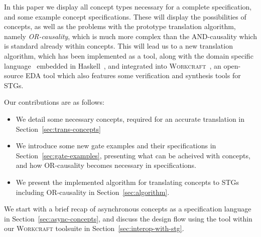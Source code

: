 \documentclass[british, journal]{IEEEtran}
\newcommand{\noun}[1]{\textsc{#1}}
\begin{document}
In this paper we display all concept types necessary for a complete specification, and some 
example concept specifications. These will display the possibilities of concepts, as well as the 
problems with the prototype translation algorithm, namely \emph{OR-causality}, which is 
much more complex than the AND-causality which is standard already within concepts. 
This will lead us to a new translation algorithm, which has been implemented as a tool, 
along with the domain specific language~\cite{2016_concepts_github} embedded in 
Haskell~\cite{1996_hudak_dsl}, and integrated into 
\noun{Workcraft}~\cite{Workcraft_website}, an open-source EDA tool which also 
features some verification and synthesis tools for STGs. 

Our contributions are as follows:
\begin{itemize}
  \item We detail some necessary concepts, required for an accurate 
  translation in Section~\ref{sec:trans-concepts}
  \item We introduce some new gate examples and their specifications in
  Section~\ref{sec:gate-examples}, presenting what can be acheived with
  concepts, and how OR-causality becomes necessary in specifications.
  \item We present the implemented algorithm for translating concepts to STGs
  including OR-causality in Section~\ref{sec:algorithm}.
\end{itemize}

\noindent
We start with a brief recap of asynchronous concepts as a specification language in
Section~\ref{sec:async-concepts}, and discuss the design flow using the tool within our
\noun{Workcraft} toolsuite in Section~\ref{sec:interop-with-stg}.

\end{document}
